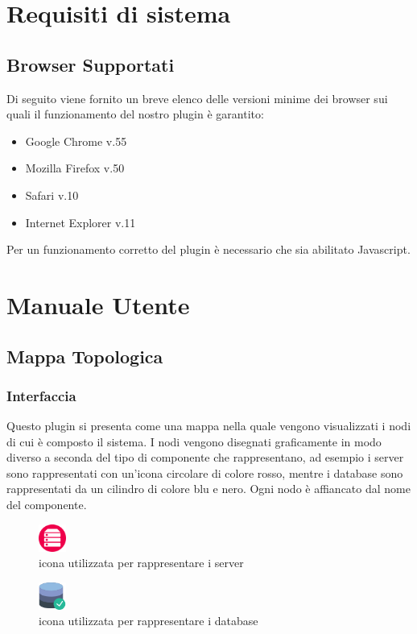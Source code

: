 \section{Requisiti di sistema}
\subsection{Browser Supportati}

Di seguito viene fornito un breve elenco delle versioni minime dei browser sui quali il funzionamento del nostro plugin è garantito:
\begin{itemize}
	
	\item Google Chrome v.55
	\item Mozilla Firefox v.50
	\item Safari v.10
	\item Internet Explorer v.11
	
\end{itemize}

Per un funzionamento corretto del plugin è necessario che sia abilitato Javascript.


\section{Manuale Utente}
\subsection{Mappa Topologica}
\label{sec:mtopologica}
\subsubsection{Interfaccia}
Questo plugin si presenta come una mappa nella quale vengono visualizzati i nodi di cui è composto il sistema. 
I nodi vengono disegnati graficamente in modo diverso a seconda del tipo di componente che rappresentano, ad esempio i server sono rappresentati con un'icona circolare di colore rosso, mentre i database sono rappresentati da un cilindro di colore blu e nero. Ogni nodo è affiancato dal nome del componente. 
\begin{figure}[H]
	\centering 
	\includegraphics[width=0.08\textwidth]{Images/server.png}
	\caption{icona utilizzata per rappresentare i server}
	\label{server} 
\end{figure}
\begin{figure}[H]
	\centering 
	\includegraphics[width=0.08\textwidth]{Images/database.png}
	\caption{icona utilizzata per rappresentare i database}
	\label{database} 
\end{figure}

